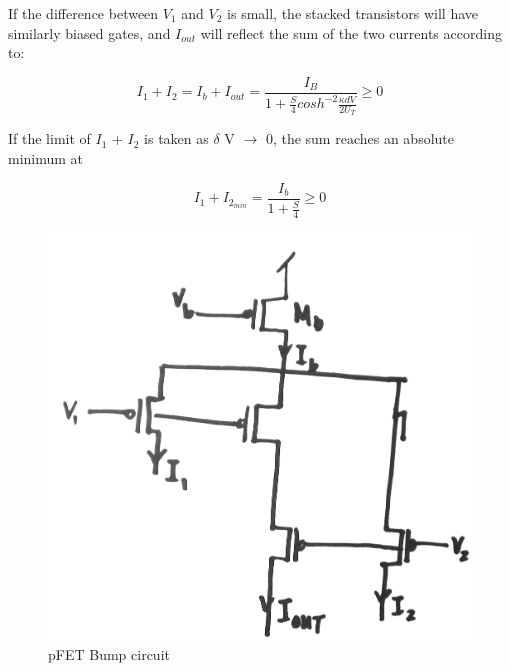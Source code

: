 \documentclass[main]{subfiles}
\begin{document}
If the difference between $V_1$ and $V_2$ is small, the stacked transistors will have similarly biased gates, and $I_{out}$ will reflect the sum of the two currents according to:

\begin{equation}
I_1+I_2 = I_b+I_{out}= \frac{I_B}{1+ \frac{S}{4} cosh^{-2} \frac{\kappa dV}{2U_T}} \geq 0
\end{equation}

If the limit of $I_1$ + $I_2$ is taken as $\delta$ V $\rightarrow$ 0, the sum reaches an absolute minimum at 

\begin{equation}
I_1+I_{2_{min}} = \frac{I_b}{1+\frac{S}{4}} \geq 0
\end{equation}


\begin{figure}[htbp]
  \centering
  \includegraphics[scale=0.2]{figs/pFET_Bump_circuit}
  \caption{pFET Bump circuit}
  \label{fig:pFET_Bump_circuit}
\end{figure}
\end{document}
